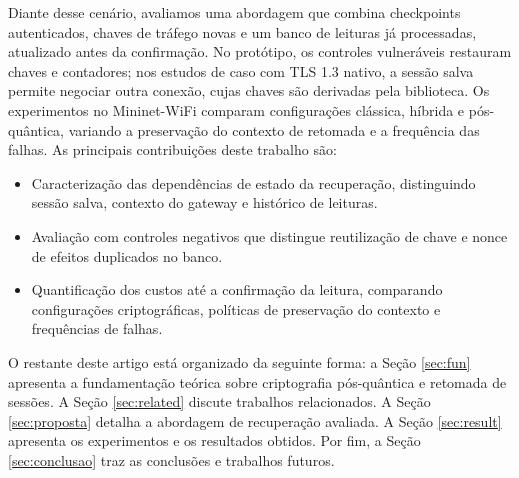 Diante desse cenário, avaliamos uma abordagem que combina checkpoints autenticados, chaves de tráfego novas e um banco de leituras já processadas, atualizado antes da confirmação. No protótipo, os controles vulneráveis restauram chaves e contadores; nos estudos de caso com TLS 1.3 nativo, a sessão salva permite negociar outra conexão, cujas chaves são derivadas pela biblioteca. Os experimentos no Mininet-WiFi comparam configurações clássica, híbrida e pós-quântica, variando a preservação do contexto de retomada e a frequência das falhas. As principais contribuições deste trabalho são:
\begin{itemize}
    \item Caracterização das dependências de estado da recuperação, distinguindo sessão salva, contexto do gateway e histórico de leituras.
    \item Avaliação com controles negativos que distingue reutilização de chave e nonce de efeitos duplicados no banco.
    \item Quantificação dos custos até a confirmação da leitura, comparando configurações criptográficas, políticas de preservação do contexto e frequências de falhas.
\end{itemize}

O restante deste artigo está organizado da seguinte forma: a Seção \ref{sec:fun} apresenta a fundamentação teórica sobre criptografia pós-quântica e retomada de sessões. A Seção \ref{sec:related} discute trabalhos relacionados. A Seção \ref{sec:proposta} detalha a abordagem de recuperação avaliada. A Seção \ref{sec:result} apresenta os experimentos e os resultados obtidos. Por fim, a Seção \ref{sec:conclusao} traz as conclusões e trabalhos futuros.
